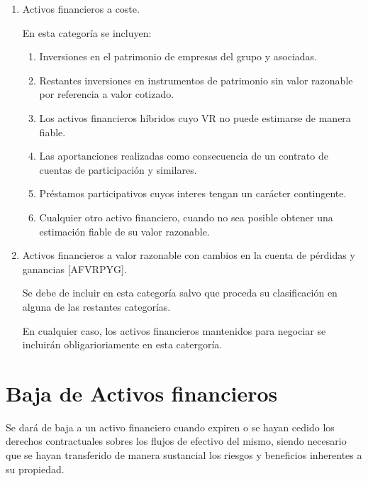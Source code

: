 \begin{enumerate}
    \item Activos financieros a coste.
    
    En esta categoría se incluyen:

    \begin{enumerate}
        \item Inversiones en el patrimonio de empresas del grupo y asociadas.
        \item Restantes inversiones en instrumentos de patrimonio sin valor razonable por referencia a valor cotizado.
        \item Los activos financieros híbridos cuyo VR no puede estimarse de manera fiable.
        \item Las aportanciones realizadas como consecuencia de un contrato de cuentas de participación y similares.
        \item Préstamos participativos cuyos interes tengan un carácter contingente.
        \item Cualquier otro activo financiero, cuando no sea posible obtener una estimación fiable de su valor razonable.
    \end{enumerate}

    \item Activos financieros a valor razonable con cambios en la cuenta de pérdidas y ganancias [AFVRPYG].
    
    Se debe de incluir en esta categoría salvo que proceda su clasificación en alguna de las restantes categorías.

    En cualquier caso, los activos financieros mantenidos para negociar se incluirán obligarioriamente en esta catergoría.


\end{enumerate}









\section{Baja de Activos financieros}

Se dará de baja a un activo financiero cuando expiren o se hayan cedido los derechos contractuales sobres los flujos de efectivo del mismo, siendo necesario que se hayan transferido de manera sustancial los riesgos y beneficios inherentes a su propiedad. 











